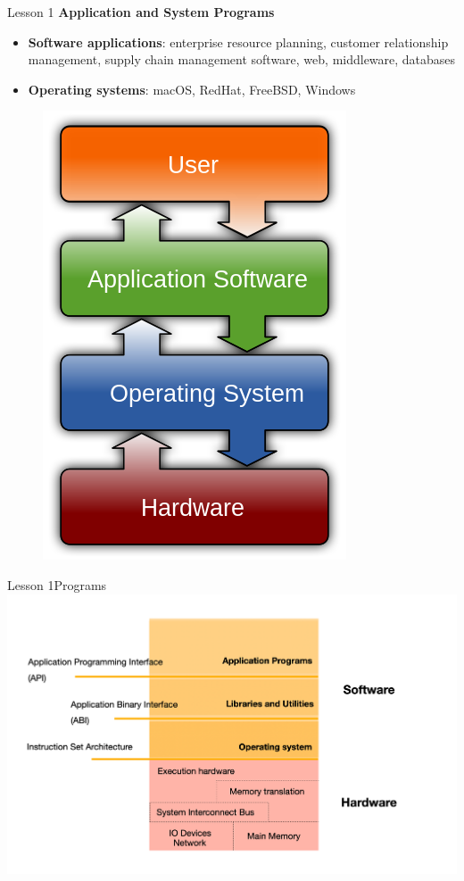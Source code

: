 \documentclass[aspectratio=1610]{beamer}
\begin{document}
\begin{frame}{Lesson 1}{}
{\Large\textbf{{Application and System Programs}}}

\Large
\begin{minipage}{0.65\textwidth}
    \begin{itemize}
      \item \textbf{Software applications}:  enterprise resource planning, customer relationship management, supply chain management software, web, middleware, databases
      \item \textbf{Operating systems}: macOS, RedHat, FreeBSD, Windows
    \end{itemize}
  \end{minipage}
\begin{minipage}{0.30\textwidth}
      \begin{figure}
        \includegraphics[scale=0.32]{Images/OS}
      \end{figure}
  \end{minipage}
\end{frame}


\begin{frame}{Lesson 1}{Programs}
\includegraphics[scale=0.15]{Images/sfwhdw}
\end{frame}
\end{document}
